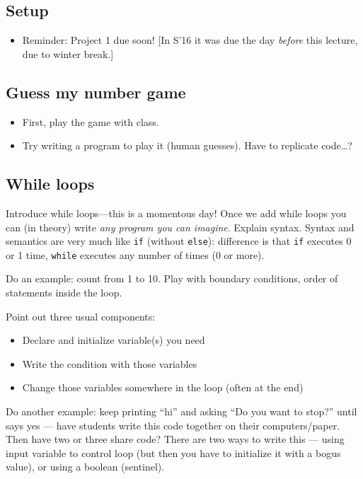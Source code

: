 \documentclass{article}
\begin{document}
\subsection*{Setup}
\begin{itemize}
\item Reminder: Project 1 due soon! [In S'16 it was due the day
  \emph{before} this lecture, due to winter break.]
\end{itemize}

\subsection*{Guess my number game}

\begin{itemize}
\item First, play the game with class.
\item Try writing a program to play it (human guesses). Have to
  replicate code\dots?
\end{itemize}

\subsection*{While loops}

Introduce while loops---this is a momentous day!  Once we add while
loops you can (in theory) write \emph{any program you can imagine}.
Explain syntax.  Syntax and semantics are very much like \verb|if|
(without \verb|else|): difference is that \verb|if| executes 0 or 1
time, \verb|while| executes any number of times (0 or more).

Do an example: count from 1 to 10.  Play with boundary conditions,
order of statements inside the loop.

Point out three usual components:
\begin{itemize}
\item Declare and initialize variable(s) you need
\item Write the condition with those variables
\item Change those variables somewhere in the loop (often at the
  end)
\end{itemize}

Do another example: keep printing ``hi'' and asking ``Do you want to
stop?'' until says yes --- have students write this code together on
their computers/paper.  Then have two or three share code?  There are
two ways to write this --- using input variable to control loop (but
then you have to initialize it with a bogus value), or using a boolean
(sentinel).
\end{document}
